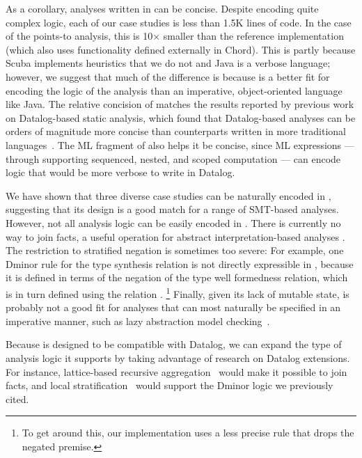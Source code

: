\documentclass[acmsmall,screen,nonacm]{acmart}
\theoremstyle{definition}
\begin{document}
As a corollary, analyses written in \Name can be concise.
Despite encoding quite complex logic, each of our case studies is less than
1.5K lines of code.
In the case of the points-to analysis, this is 10$\times$ smaller than the
reference implementation (which also uses functionality defined externally in
Chord).
This is partly because Scuba implements heuristics that we do not and Java is a
verbose language; however, we suggest that much of the difference is because
\Name is a better fit for encoding the logic of the analysis than an
imperative, object-oriented language like Java.
The relative concision of \Name matches the results reported by previous work
on Datalog-based static analysis, which found that Datalog-based analyses can
be orders of magnitude more concise than counterparts written in more
traditional languages~\citep{bddbddbUsing}.
The ML fragment of \Name also helps it be concise, since ML expressions ---
through supporting sequenced, nested, and scoped computation --- can encode
logic that would be more verbose to write in Datalog.

We have shown that three diverse case studies can be naturally encoded in
\Name, suggesting that its design is a good match for a range of SMT-based
analyses.
However, not all analysis logic can be easily encoded in \Name.
There is currently no way to join facts, a useful operation for abstract
interpretation-based analyses \citep{cousot1977abstract}.
The restriction to stratified negation is sometimes too severe:
For example, one Dminor rule for the type synthesis relation  is not
directly expressible in \Name, because it is defined in terms of the negation
of the type well formedness relation, which is in turn defined using the
relation .%
\footnote{To get around this, our implementation uses a less precise rule that
drops the negated premise.}
Finally, given its lack of mutable state, \Name is probably not a good fit for
analyses that can most naturally be specified in an imperative manner, such as
lazy abstraction model checking~\citep{lazyabs}.

Because \Name is designed to be compatible with Datalog, we can expand the type
of analysis logic it supports by taking advantage of research on Datalog
extensions. 
For instance, lattice-based recursive aggregation~\citep{flix,inca} would make
it possible to join facts, and local
stratification~\citep{przymusinski1988declarative} would support the Dminor
logic we previously cited.
\end{document}
